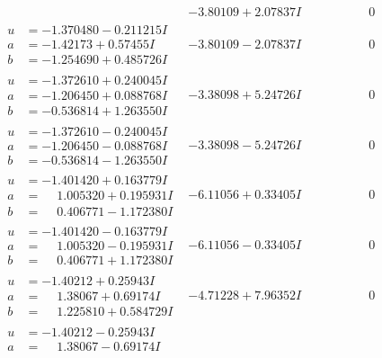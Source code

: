 \documentclass[1p]{elsarticle_modified}
\theoremstyle{definition}
\begin{document}
$$\begin{array}{c|c|c}
 & -3.80109 + 2.07837 I & \phantom{-0.000000 } 0 \\ \hline\begin{aligned}
u &= -1.370480 - 0.211215 I \\
a &= -1.42173 + 0.57455 I \\
b &= -1.254690 + 0.485726 I\end{aligned}
 & -3.80109 - 2.07837 I & \phantom{-0.000000 } 0 \\ \hline\begin{aligned}
u &= -1.372610 + 0.240045 I \\
a &= -1.206450 + 0.088768 I \\
b &= -0.536814 + 1.263550 I\end{aligned}
 & -3.38098 + 5.24726 I & \phantom{-0.000000 } 0 \\ \hline\begin{aligned}
u &= -1.372610 - 0.240045 I \\
a &= -1.206450 - 0.088768 I \\
b &= -0.536814 - 1.263550 I\end{aligned}
 & -3.38098 - 5.24726 I & \phantom{-0.000000 } 0 \\ \hline\begin{aligned}
u &= -1.401420 + 0.163779 I \\
a &= \phantom{-}1.005320 + 0.195931 I \\
b &= \phantom{-}0.406771 - 1.172380 I\end{aligned}
 & -6.11056 + 0.33405 I & \phantom{-0.000000 } 0 \\ \hline\begin{aligned}
u &= -1.401420 - 0.163779 I \\
a &= \phantom{-}1.005320 - 0.195931 I \\
b &= \phantom{-}0.406771 + 1.172380 I\end{aligned}
 & -6.11056 - 0.33405 I & \phantom{-0.000000 } 0 \\ \hline\begin{aligned}
u &= -1.40212 + 0.25943 I \\
a &= \phantom{-}1.38067 + 0.69174 I \\
b &= \phantom{-}1.225810 + 0.584729 I\end{aligned}
 & -4.71228 + 7.96352 I & \phantom{-0.000000 } 0 \\ \hline\begin{aligned}
u &= -1.40212 - 0.25943 I \\
a &= \phantom{-}1.38067 - 0.69174 I \\

\end{aligned}
\end{array}$$
\end{document}
